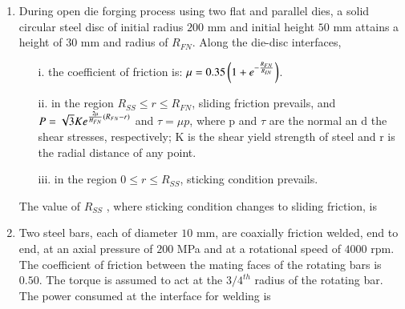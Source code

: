 \documentclass[journal,12pt,onecolumn]{IEEEtran}
\theoremstyle{remark}
\begin{document}
\begin{enumerate}
\item During open die forging process using two flat and parallel dies, a solid circular steel disc of initial radius  $200$ mm and initial height  $50$ mm attains a height  of $30$ mm and radius of $R_{FN}$. Along the die-disc interfaces,
\begin{enumerate}
    \item[i.] the coefficient of friction \brak{\mu} is: $\mu = 0.35\left(1+e^{-\frac{R_{FN}}{R_{IN}}}\right)$.
    \item[ii.] in the region $R_{SS} \le r \le R_{FN}$, sliding friction prevails, and $P = \sqrt{3} K e^{\frac{2\mu}{H_{FN}}\left(R_{FN}-r\right)}$ and $\tau = \mu p$, where p and $\tau$ are the normal an d the shear stresses, respectively; K is the shear yield strength of steel and r is the radial distance of any point.
    \item[iii.] in the region $0 \le r \le R_{SS}$, sticking condition prevails.
\end{enumerate}
The value of $R_{SS}$ , where sticking condition changes to sliding friction, is
\hfill{}
\begin{enumerate}
\end{enumerate}

\item Two steel bars, each of diameter $10$ mm, are coaxially friction welded, end to end, at an axial pressure of $200$ MPa and at a rotational speed of $4000$ rpm. The coefficient of friction between the mating faces of the rotating bars is $0.50$. The torque is assumed to act at the $3/4^{th}$ radius of the rotating bar. The power  consumed at the interface for welding is
\hfill{}
\begin{enumerate}
\end{enumerate}


\end{enumerate}
\end{document}
